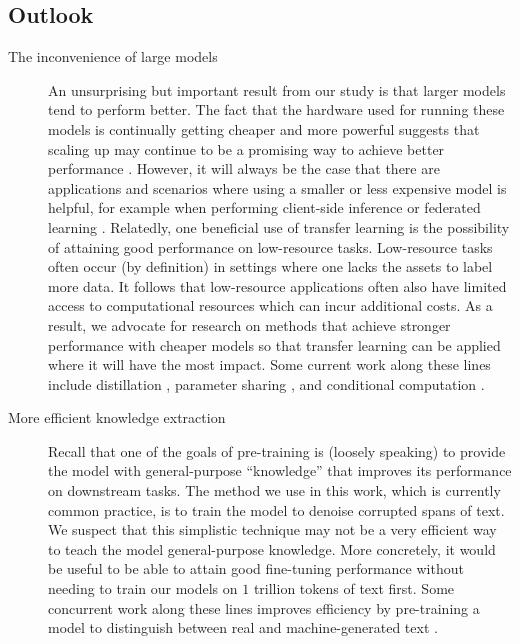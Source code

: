 \subsection{Outlook}

\begin{description}

\item[The inconvenience of large models] An unsurprising but important result from our study is that larger models tend to perform better. The fact that the hardware used for running these models is continually getting cheaper and more powerful suggests that scaling up may continue to be a promising way to achieve better performance \citep{sutton2019bitter}. However, it will always be the case that there are applications and scenarios where using a smaller or less expensive model is helpful, for example when performing client-side inference or federated learning \citep{konevcny2015federated,konevcny2016federated}. Relatedly, one beneficial use of transfer learning is the possibility of attaining good performance on low-resource tasks. Low-resource tasks often occur (by definition) in settings where one lacks the assets to label more data. It follows that low-resource applications often also have limited access to computational resources which can incur additional costs. As a result, we advocate for research on methods that achieve stronger performance with cheaper models so that transfer learning can be applied where it will have the most impact. Some current work along these lines include distillation \citep{hinton2015distilling,sanh2019distilbert,jiao2019tinybert}, parameter sharing \citep{lan2019albert}, and conditional computation \citep{shazeer2017outrageously}.

\item[More efficient knowledge extraction] Recall that one of the goals of pre-training is (loosely speaking) to provide the model with general-purpose ``knowledge'' that improves its performance on downstream tasks. The method we use in this work, which is currently common practice, is to train the model to denoise corrupted spans of text. We suspect that this simplistic technique may not be a very efficient way to teach the model general-purpose knowledge. More concretely, it would be useful to be able to attain good fine-tuning performance without needing to train our models on $1$ trillion tokens of text first. Some concurrent work along these lines improves efficiency by pre-training a model to distinguish between real and machine-generated text \citep{clark2020electra}.


\end{description}
